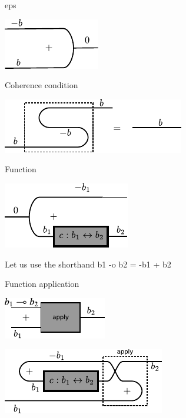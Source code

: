 \documentclass[preprint]{sigplanconf}
\begin{document}
{{eps}}

\begin{center}
  \includegraphics{diagrams/eps.pdf}
\end{center}

Coherence condition

\begin{center}
  \includegraphics{diagrams/coherence.pdf}
\end{center}

Function

\begin{center}
  \includegraphics{diagrams/function.pdf}
\end{center}

Let us use the shorthand {{b1 -o b2 = -b1 + b2}}

Function application

\begin{center}
  \includegraphics{diagrams/apply1.pdf}
\end{center}

\begin{center}
  \includegraphics{diagrams/apply2.pdf}
\end{center}
\end{document}
